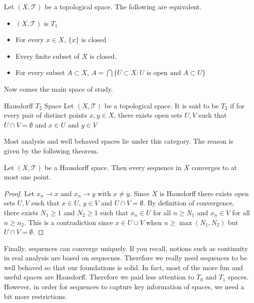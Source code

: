 \documentclass[a4paper]{article}
\begin{document}
\begin{prp}{}{} Let $(X,\mathcal{T})$ be a topological space. The following are equivalent. 
\begin{itemize}
\item $(X,\mathcal{T})$ is $T_1$
\item For every $x\in X$, $\{x\}$ is closed
\item Every finite subset of $X$ is closed. 
\item For every subset $A\subset X$, $A=\bigcap\{U\subset X:U\text{ is open and }A\subset U\}$
\end{itemize}
\end{prp}

Now comes the main space of study. 

\begin{defn}{Hausdorff $T_2$ Space}{} Let $(X,\mathcal{T})$ be a topological space. It is said to be $T_2$ if for every pair of distinct points $x,y\in X$, there exists open sets $U,V$ such that $U\cap V=\emptyset$ and $x\in U$ and $y\in V$
\end{defn}

Most analysis and well behaved spaces lie under this category. The reason is given by the following theorem. 

\begin{thm}{}{} Let $(X,\mathcal{T})$ be a Hausdorff space. Then every sequence in $X$ converges to at most one point. \tcbline
\begin{proof}
Let $x_n\to x$ and $x_n\to y$ with $x\neq y$. Since $X$ is Hausdorff there exists open sets $U,V$ such that $x\in U$, $y\in V$ and $U\cap V=\emptyset$. By definition of convergence, there exists $N_1\geq 1$ and $N_2\geq 1$ such that $x_n\in U$ for all $n\geq N_1$ and $x_n\in V$ for all $n\geq n_2$. This is a contradiction since $x\in U\cup V$ when $n\geq \max(N_1,N_2)$ but $U\cap V=\emptyset$. 
\end{proof}
\end{thm}

Finally, sequences can converge uniquely. If you recall, notions such as continuity in real analysis are based on sequecnes. Therefore we really need sequences to be well behaved so that our foundations is solid. In fact, most of the more fun and useful spaces are Hausdorff. Therefore we paid less attention to $T_0$ and $T_1$ spaces. However, in order for sequences to capture key information of spaces, we need a bit more restrictions. 
\end{document}

